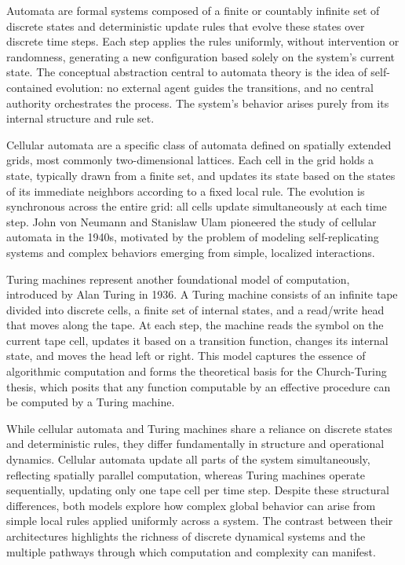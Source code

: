 Automata are formal systems composed of a finite or countably infinite set of discrete states and deterministic update rules that evolve these states over discrete time steps. Each step applies the rules uniformly, without intervention or randomness, generating a new configuration based solely on the system's current state. The conceptual abstraction central to automata theory is the idea of self-contained evolution: no external agent guides the transitions, and no central authority orchestrates the process. The system's behavior arises purely from its internal structure and rule set.

Cellular automata are a specific class of automata defined on spatially extended grids, most commonly two-dimensional lattices. Each cell in the grid holds a state, typically drawn from a finite set, and updates its state based on the states of its immediate neighbors according to a fixed local rule. The evolution is synchronous across the entire grid: all cells update simultaneously at each time step. John von Neumann and Stanislaw Ulam pioneered the study of cellular automata in the 1940s, motivated by the problem of modeling self-replicating systems and complex behaviors emerging from simple, localized interactions.

Turing machines represent another foundational model of computation, introduced by Alan Turing in 1936. A Turing machine consists of an infinite tape divided into discrete cells, a finite set of internal states, and a read/write head that moves along the tape. At each step, the machine reads the symbol on the current tape cell, updates it based on a transition function, changes its internal state, and moves the head left or right. This model captures the essence of algorithmic computation and forms the theoretical basis for the Church-Turing thesis, which posits that any function computable by an effective procedure can be computed by a Turing machine.

While cellular automata and Turing machines share a reliance on discrete states and deterministic rules, they differ fundamentally in structure and operational dynamics. Cellular automata update all parts of the system simultaneously, reflecting spatially parallel computation, whereas Turing machines operate sequentially, updating only one tape cell per time step. Despite these structural differences, both models explore how complex global behavior can arise from simple local rules applied uniformly across a system. The contrast between their architectures highlights the richness of discrete dynamical systems and the multiple pathways through which computation and complexity can manifest.

